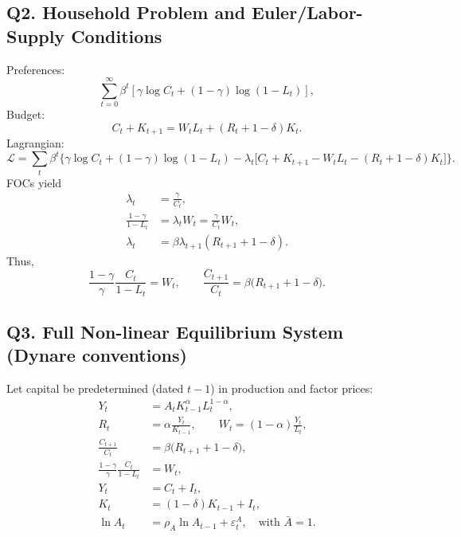 \documentclass[a4paper,12pt]{article} %
\theoremstyle{nonitalic}
\begin{document}
\subsection{Q2. Household Problem and Euler/Labor-Supply Conditions}
Preferences:
\begin{equation}
\sum_{t=0}^\infty \beta^t\left[ \gamma \log C_t + (1-\gamma)\log(1-L_t)\right],
\end{equation}
Budget:
\begin{equation}
C_t + K_{t+1} = W_t L_t + (R_t+1-\delta) K_t.
\end{equation}
Lagrangian:
\[
\mathcal{L}=\sum_t \beta^t\Big\{\gamma\log C_t+(1-\gamma)\log(1-L_t)-\lambda_t\big[C_t+K_{t+1}-W_tL_t-(R_t+1-\delta)K_t\big]\Big\}.
\]
FOCs yield
\begin{align}
\lambda_t &= \frac{\gamma}{C_t},\\[4pt]
\frac{1-\gamma}{1-L_t} &= \lambda_t W_t = \frac{\gamma}{C_t} W_t,\\[4pt]
\lambda_t &= \beta \lambda_{t+1}(R_{t+1}+1-\delta).
\end{align}
Thus,
\begin{equation}
\boxed{\frac{1-\gamma}{\gamma}\frac{C_t}{1-L_t}=W_t},\qquad
\boxed{\frac{C_{t+1}}{C_t}=\beta\big(R_{t+1}+1-\delta\big)}.
\end{equation}

\subsection{Q3. Full Non-linear Equilibrium System (Dynare conventions)}
Let capital be predetermined (dated $t-1$) in production and factor prices:
\begin{align}
Y_t &= A_t K_{t-1}^{\alpha} L_t^{1-\alpha},\\
R_t &= \alpha \frac{Y_t}{K_{t-1}},\qquad W_t=(1-\alpha)\frac{Y_t}{L_t},\\
\frac{C_{t+1}}{C_t} &= \beta \big(R_{t+1}+1-\delta\big),\\
\frac{1-\gamma}{\gamma}\frac{C_t}{1-L_t} &= W_t,\\
Y_t &= C_t + I_t,\\
K_t &= (1-\delta)K_{t-1}+I_t,\\
\ln A_t &= \rho_A \ln A_{t-1} + \varepsilon^A_t,\quad \text{with } \bar A=1.
\end{align}
\end{document}
